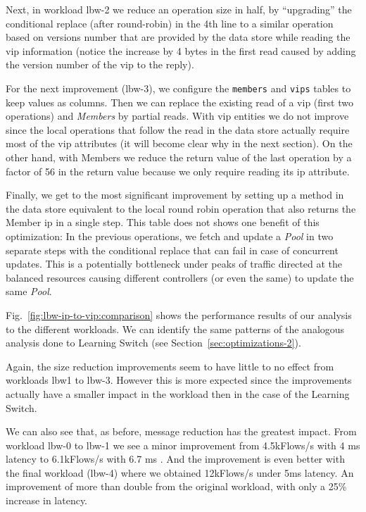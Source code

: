 Next, in workload lbw-2 we reduce an operation size in half, by ``upgrading'' the conditional replace (after round-robin) in the 4th line to a similar operation based on  versions number that are  provided by the data store while reading the \gls{vip} information (notice the increase by 4 bytes in the first read caused by adding the version number of the \gls{vip} to the reply).  

For the next improvement (lbw-3), we configure the \texttt{members} and \texttt{vips} tables to keep values as columns. 
Then we can replace the existing read of a \gls{vip} (first two operations) and \emph{Members} by partial reads. 
With \gls{vip} entities we do not improve since the local operations that follow the read in the
data store actually require most of the \gls{vip} attributes (it will become clear why in the next section). 
On the other hand,  with Members we reduce the return value of the last operation  by a factor of 56 in the return value because we only require reading its \gls{ip} attribute. 

Finally, we get to the most significant improvement by setting up a method in the data store equivalent to the local round robin operation that also returns the Member \gls{ip} in a single step.
This table does not shows one benefit of this optimization: 
In the previous operations, we  fetch and update a \emph{Pool} in two separate steps with the conditional replace that can fail in case of concurrent updates. 
This is a potentially bottleneck under peaks of traffic directed at the balanced resources causing different  controllers (or even the same) to update the same \emph{Pool}. 



Fig.~\ref{fig:lbw-ip-to-vip:comparison} shows the performance results of our analysis to the different workloads. We can identify the same patterns of the analogous analysis done to Learning Switch (see Section~\ref{sec:optimizations-2}). 


Again, the size reduction improvements seem to have little to no effect from workloads lbw1 to lbw-3. 
However this is more expected since the improvements actually have a smaller impact in the workload then in the case of the Learning Switch. 

We can also see that, as before, message reduction has the greatest impact. 
From workload lbw-0 to lbw-1 we see a minor improvement from 4.5kFlows/s with 4 ms latency to 6.1kFlows/s with 6.7 ms .
And the improvement is even better with the final workload (lbw-4) where we obtained 12kFlows/s  under 5ms latency. 
An improvement of more than double from the original workload, with only a 25\% increase in latency. 

